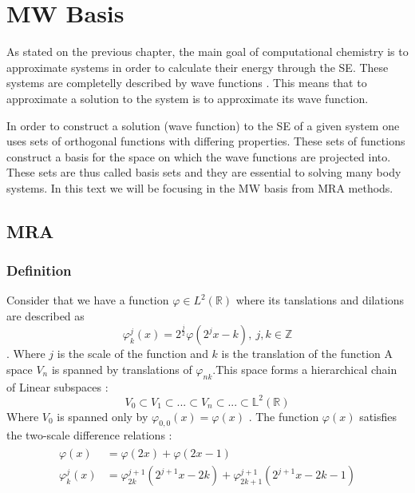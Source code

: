 \documentclass[../master_thesis.tex]{subfiles}
\begin{document}
\chapter{\ac{MW} Basis}
As stated on the previous chapter, the main goal of computational chemistry is
to approximate systems in order to calculate their energy through the \ac{SE}. %
These systems are completelly described by wave functions \cite{Cohen:1973}.
This means that to approximate a solution to the system is to approximate its
wave function.

In order to construct a solution (wave function) to the \ac{SE} of a given
system one uses sets of orthogonal functions with differing properties. These
sets of functions construct a basis for the space on which the wave functions
are projected into. These sets are thus called basis sets \cite{Cramer:2004}
and they are essential to solving many body systems. In this text we will be
focusing in the \ac{MW} basis from \ac{MRA} methods.

\section{\ac{MRA}}
\subsection{Definition}
Consider that we have a function $\varphi \in L^2(\mathbb{R})$ where its tanslations
and dilations are described as \cite{Schneider:2007}
\begin{equation}
  \varphi^j_k(x) = 2^{\frac{j}{2}}\varphi(2^jx - k),\  j,k \in \mathbb{Z}
\end{equation}.
Where $j$ is the scale of the function and $k$ is the translation of the function
\cite{Sorland}
A space $V_n$ is spanned by translations of $\varphi_{nk}$.This space forms a
hierarchical chain of Linear
subspaces \cite{Beylkin:MRA}:
\begin{equation}
  V_0 \subset V_1 \subset ... \subset V_n \subset ... \subset \mathbb{L}^2(\mathbb{R})\label{eq:seqsubspace}
\end{equation}
Where $V_0$ is spanned only by $\varphi_{0,0}(x)=\varphi(x)$ \cite{Sorland}.
The function $\varphi(x)$ satisfies the two-scale difference relations \cite{Beylkin:MRA, Schneider:2007, Sorland}:
\begin{align}
  \begin{split}
    \varphi(x) &= \varphi(2x) + \varphi(2x - 1)\\
    \varphi^j_k(x) &= \varphi^{j+1}_{2k}(2^{j+1}x - 2k) + \varphi^{j+1}_{2k+1}(2^{j+1}x - 2k - 1)
  \end{split}
\end{align}
\end{document}

